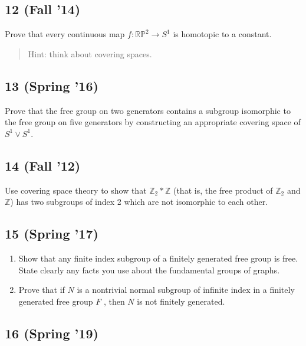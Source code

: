 \hypertarget{fall-14-4}{%
\subsection{12 (Fall '14)}\label{fall-14-4}}

Prove that every continuous map \(f : {\mathbb{RP}}^2 \to S^1\) is
homotopic to a constant.

\begin{quote}
Hint: think about covering spaces.
\end{quote}

\hypertarget{spring-16-1}{%
\subsection{13 (Spring '16)}\label{spring-16-1}}

Prove that the free group on two generators contains a subgroup
isomorphic to the free group on five generators by constructing an
appropriate covering space of \(S^1 \lor S^1\).

\hypertarget{fall-12-1}{%
\subsection{14 (Fall '12)}\label{fall-12-1}}

Use covering space theory to show that
\({\mathbb{Z}}_2 \ast {\mathbb{Z}}\) (that is, the free product of
\({\mathbb{Z}}_2\) and \({\mathbb{Z}}\)) has two subgroups of index 2
which are not isomorphic to each other.

\hypertarget{spring-17-1}{%
\subsection{15 (Spring '17)}\label{spring-17-1}}

\begin{enumerate}
\def\labelenumi{\alph{enumi}.}
\item
  Show that any finite index subgroup of a finitely generated free group
  is free. State clearly any facts you use about the fundamental groups
  of graphs.
\item
  Prove that if \(N\) is a nontrivial normal subgroup of infinite index
  in a finitely generated free group \(F\) , then \(N\) is not finitely
  generated.
\end{enumerate}

\hypertarget{spring-19-2}{%
\subsection{16 (Spring '19)}\label{spring-19-2}}

